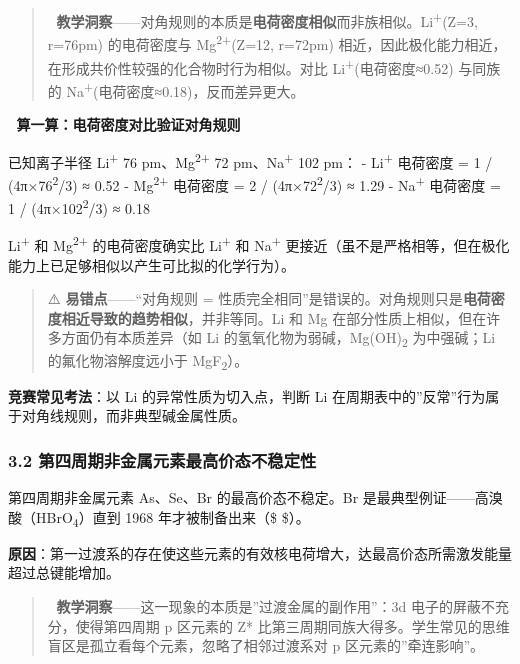 \documentclass[a4paper,11pt]{ctexart}
\begin{document}
\begin{quote}
🧠 \textbf{教学洞察}------对角规则的本质是\textbf{电荷密度相似}而非族相似。Li\textsuperscript{+}(Z=3, r=76pm) 的电荷密度与 Mg\textsuperscript{2+}(Z=12, r=72pm) 相近，因此极化能力相近，在形成共价性较强的化合物时行为相似。对比 Li\textsuperscript{+}(电荷密度≈0.52) 与同族的 Na\textsuperscript{+}(电荷密度≈0.18)，反而差异更大。
\end{quote}

📝 \textbf{算一算：电荷密度对比验证对角规则}

已知离子半径 Li\textsuperscript{+} 76 pm、Mg\textsuperscript{2+} 72 pm、Na\textsuperscript{+} 102 pm：
- Li\textsuperscript{+} 电荷密度 = 1 / (4π×76\textsuperscript{2}/3) ≈ 0.52
- Mg\textsuperscript{2+} 电荷密度 = 2 / (4π×72\textsuperscript{2}/3) ≈ 1.29
- Na\textsuperscript{+} 电荷密度 = 1 / (4π×102\textsuperscript{2}/3) ≈ 0.18

Li\textsuperscript{+} 和 Mg\textsuperscript{2+} 的电荷密度确实比 Li\textsuperscript{+} 和 Na\textsuperscript{+} 更接近（虽不是严格相等，但在极化能力上已足够相似以产生可比拟的化学行为）。

\begin{quote}
⚠️ \textbf{易错点}------``对角规则 = 性质完全相同''是错误的。对角规则只是\textbf{电荷密度相近导致的趋势相似}，并非等同。Li 和 Mg 在部分性质上相似，但在许多方面仍有本质差异（如 Li 的氢氧化物为弱碱，Mg(OH)\textsubscript{2} 为中强碱；Li 的氟化物溶解度远小于 MgF\textsubscript{2}）。
\end{quote}

\textbf{竞赛常见考法}：以 Li 的异常性质为切入点，判断 Li 在周期表中的''反常''行为属于对角线规则，而非典型碱金属性质。

\subsubsection{3.2 第四周期非金属元素最高价态不稳定性}\label{ux7b2cux56dbux5468ux671fux975eux91d1ux5c5eux5143ux7d20ux6700ux9ad8ux4ef7ux6001ux4e0dux7a33ux5b9aux6027}

第四周期非金属元素 As、Se、Br 的最高价态不稳定。Br 是最典型例证------高溴酸（HBrO\textsubscript{4}）直到 1968 年才被制备出来（\$  \$）。

\textbf{原因}：第一过渡系的存在使这些元素的有效核电荷增大，达最高价态所需激发能量超过总键能增加。

\begin{quote}
🧠 \textbf{教学洞察}------这一现象的本质是''过渡金属的副作用''：3d 电子的屏蔽不充分，使得第四周期 p 区元素的 Z* 比第三周期同族大得多。学生常见的思维盲区是孤立看每个元素，忽略了相邻过渡系对 p 区元素的''牵连影响''。
\end{quote}
\end{document}

